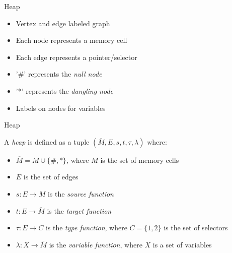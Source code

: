\begin{frame}[fragile]{Heap}
    
    \pause
    \begin{itemize}
        \item <2-> Vertex and edge labeled graph 
        \item <3-> Each node represents a memory cell
        \item <4-> Each edge represents a pointer/selector
        \item <5-> '\#' represents the \textit{null node}
        \item <6-> '*' represents the \textit{dangling node}
        \item <7-> Labels on nodes for variables
    \end{itemize}

\end{frame}

\begin{frame}[fragile]{Heap}
    
    \pause
    \begin{definition}
        A \textit{heap} is defined as a tuple $(\overline{M}, E, s, t, \tau, \lambda)$
        where:
        \begin{itemize}
            \item <3-> $\overline{M} = M \cup \{\#, *\}$, where $M$ is the set of memory cells
            \item <4-> $E$ is the set of edges
            \item <5-> $s : E \rightarrow M$ is the \textit{source function} 
            \item <6-> $t : E \rightarrow \overline{M}$ is the \textit{target function}
            \item <7-> $\tau : E \rightarrow C$ is the \textit{type function}, where $C = \{1, 2\}$ is the set of selectors
            \item <8-> $\lambda : X \rightarrow \overline{M}$ is the \textit{variable function}, where $X$ is a set of variables
        \end{itemize}
    \end{definition}
\end{frame}

